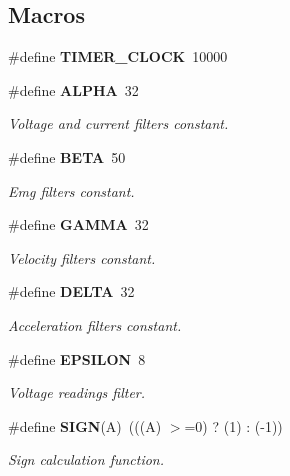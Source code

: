 \subsection*{Macros}
\begin{DoxyCompactItemize}
\item 
\mbox{\label{utils_8h_a05ec5d63e2ba7621d706137124efca7d}} 
\#define {\bfseries T\+I\+M\+E\+R\+\_\+\+C\+L\+O\+CK}~10000
\item 
\mbox{\label{utils_8h_af5abd28c44c29b7397c84f1fec4b1d84}} 
\#define \textbf{ A\+L\+P\+HA}~32
\begin{DoxyCompactList}\small\item\em Voltage and current filters constant. \end{DoxyCompactList}\item 
\mbox{\label{utils_8h_a1b996515309fc3c03449912bb33046e3}} 
\#define \textbf{ B\+E\+TA}~50
\begin{DoxyCompactList}\small\item\em Emg filters constant. \end{DoxyCompactList}\item 
\mbox{\label{utils_8h_a8659b9de3e544ff142b153b076f30fd5}} 
\#define \textbf{ G\+A\+M\+MA}~32
\begin{DoxyCompactList}\small\item\em Velocity filters constant. \end{DoxyCompactList}\item 
\mbox{\label{utils_8h_a3fd2b1bcd7ddcf506237987ad780f495}} 
\#define \textbf{ D\+E\+L\+TA}~32
\begin{DoxyCompactList}\small\item\em Acceleration filters constant. \end{DoxyCompactList}\item 
\mbox{\label{utils_8h_a002b2f4894492820fe708b1b7e7c5e70}} 
\#define \textbf{ E\+P\+S\+I\+L\+ON}~8
\begin{DoxyCompactList}\small\item\em Voltage readings filter. \end{DoxyCompactList}\item 
\mbox{\label{utils_8h_a8c7db0cde6d591a5abad279ba92ef021}} 
\#define \textbf{ S\+I\+GN}(A)~(((A) $>$=0) ? (1) \+: (-\/1))
\begin{DoxyCompactList}\small\item\em Sign calculation function. \end{DoxyCompactList}\end{DoxyCompactItemize}
